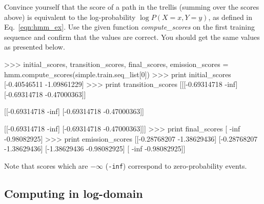 \begin{exercise}
Convince yourself that the score of a path in the trellis 
(summing over the scores above) is equivalent 
to the log-probability $\log P(X=x,Y=y)$, 
as defined in 
Eq.~\ref{eqn:hmm_ex}. 
Use the given function \emph{compute\_scores} on the first training sequence and confirm that the values are correct. You should get the same values as presented below.


%

\begin{python}
>>> initial_scores, transition_scores, final_scores, emission_scores = hmm.compute_scores(simple.train.seq_list[0])
>>> print initial_scores
[-0.40546511 -1.09861229]
>>> print transition_scores
[[[-0.69314718        -inf]
  [-0.69314718 -0.47000363]]

 [[-0.69314718        -inf]
  [-0.69314718 -0.47000363]]

 [[-0.69314718        -inf]
  [-0.69314718 -0.47000363]]]
>>> print final_scores
[       -inf -0.98082925]
>>> print emission_scores
[[-0.28768207 -1.38629436]
 [-0.28768207 -1.38629436]
 [-1.38629436 -0.98082925]
 [       -inf -0.98082925]] 
\end{python}

Note that scores which are $-\infty$ (\texttt{-inf}) correspond
to zero-probability events. 
\end{exercise}

\subsection{Computing in log-domain}\label{sec:logdomain}

